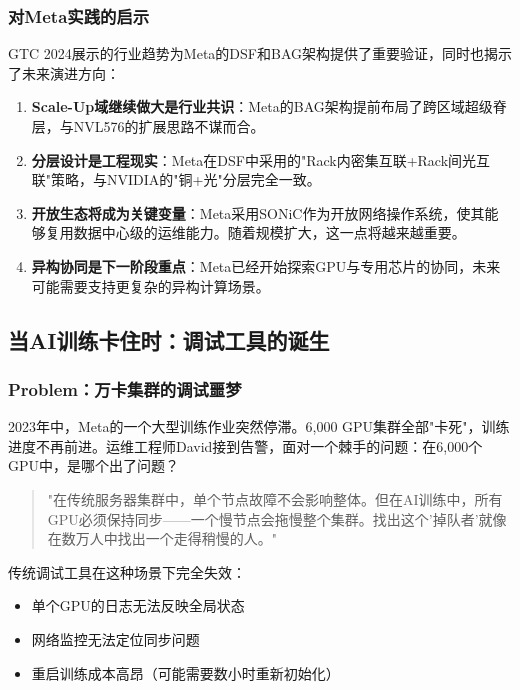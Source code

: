 \subsubsection{对Meta实践的启示}

GTC 2024展示的行业趋势为Meta的DSF和BAG架构提供了重要验证，同时也揭示了未来演进方向：

\begin{enumerate}
    \item \textbf{Scale-Up域继续做大是行业共识}：Meta的BAG架构提前布局了跨区域超级脊层，与NVL576的扩展思路不谋而合。
    
    \item \textbf{分层设计是工程现实}：Meta在DSF中采用的"Rack内密集互联+Rack间光互联"策略，与NVIDIA的"铜+光"分层完全一致。
    
    \item \textbf{开放生态将成为关键变量}：Meta采用SONiC作为开放网络操作系统，使其能够复用数据中心级的运维能力。随着规模扩大，这一点将越来越重要。
    
    \item \textbf{异构协同是下一阶段重点}：Meta已经开始探索GPU与专用芯片的协同，未来可能需要支持更复杂的异构计算场景。
\end{enumerate}

\subsection{当AI训练卡住时：调试工具的诞生}

\subsubsection{Problem：万卡集群的调试噩梦}

2023年中，Meta的一个大型训练作业突然停滞。6,000 GPU集群全部"卡死"，训练进度不再前进。运维工程师David接到告警，面对一个棘手的问题：在6,000个GPU中，是哪个出了问题？

\begin{quote}
"在传统服务器集群中，单个节点故障不会影响整体。但在AI训练中，所有GPU必须保持同步——一个慢节点会拖慢整个集群。找出这个'掉队者'就像在数万人中找出一个走得稍慢的人。"
\end{quote}

传统调试工具在这种场景下完全失效：

\begin{itemize}
    \item 单个GPU的日志无法反映全局状态
    \item 网络监控无法定位同步问题
    \item 重启训练成本高昂（可能需要数小时重新初始化）
\end{itemize}

